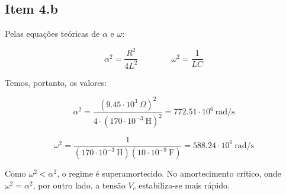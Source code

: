 \documentclass[11pt]{article}
\begin{document}
\subsection*{Item 4.b}

Pelas equações teóricas de $\alpha$ e $\omega$:

$$
  \alpha^2 = \frac{R^2}{4L^2} \qquad \qquad \omega^2 = \frac{1}{LC}
$$

Temos, portanto, os valores:

$$
  \alpha^2 = \frac{(9.45 \cdot 10^3\ \Omega)^2}{4 \cdot (170 \cdot 10^{-3}\ \text{H})^2} = 772.51 \cdot 10^6\ \text{rad/s}
$$

$$
  \omega^2 = \frac{1}{(170 \cdot 10^{-3}\ \text{H})(10 \cdot 10^{-9}\ \text{F})} = 588.24 \cdot 10^6\ \text{rad/s}
$$

Como $\omega^2 < \alpha^2$, o regime é superamortecido. No amortecimento crítico, onde $\omega^2 = \alpha^2$, por outro lado, a tensão $V_c$ estabiliza-se mais rápido.
\end{document}
